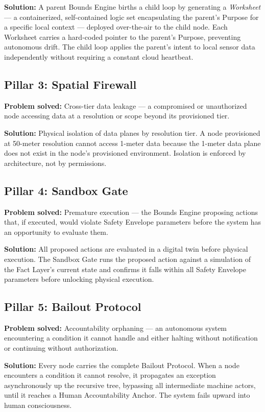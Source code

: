 \documentclass[12pt]{article}
\begin{document}
\textbf{Solution:} A parent Bounds Engine births a child loop by generating a \textit{Worksheet} --- a containerized, self-contained logic set encapsulating the parent's Purpose for a specific local context --- deployed over-the-air to the child node. Each Worksheet carries a hard-coded pointer to the parent's Purpose, preventing autonomous drift. The child loop applies the parent's intent to local sensor data independently without requiring a constant cloud heartbeat.

\subsection{Pillar 3: Spatial Firewall}
\textbf{Problem solved:} Cross-tier data leakage --- a compromised or unauthorized node accessing data at a resolution or scope beyond its provisioned tier.

\textbf{Solution:} Physical isolation of data planes by resolution tier. A node provisioned at 50-meter resolution cannot access 1-meter data because the 1-meter data plane does not exist in the node's provisioned environment. Isolation is enforced by architecture, not by permissions.

\subsection{Pillar 4: Sandbox Gate}
\textbf{Problem solved:} Premature execution --- the Bounds Engine proposing actions that, if executed, would violate Safety Envelope parameters before the system has an opportunity to evaluate them.

\textbf{Solution:} All proposed actions are evaluated in a digital twin before physical execution. The Sandbox Gate runs the proposed action against a simulation of the Fact Layer's current state and confirms it falls within all Safety Envelope parameters before unlocking physical execution.

\subsection{Pillar 5: Bailout Protocol}
\textbf{Problem solved:} Accountability orphaning --- an autonomous system encountering a condition it cannot handle and either halting without notification or continuing without authorization.

\textbf{Solution:} Every node carries the complete Bailout Protocol. When a node encounters a condition it cannot resolve, it propagates an exception asynchronously up the recursive tree, bypassing all intermediate machine actors, until it reaches a Human Accountability Anchor. The system fails upward into human consciousness.
\end{document}
